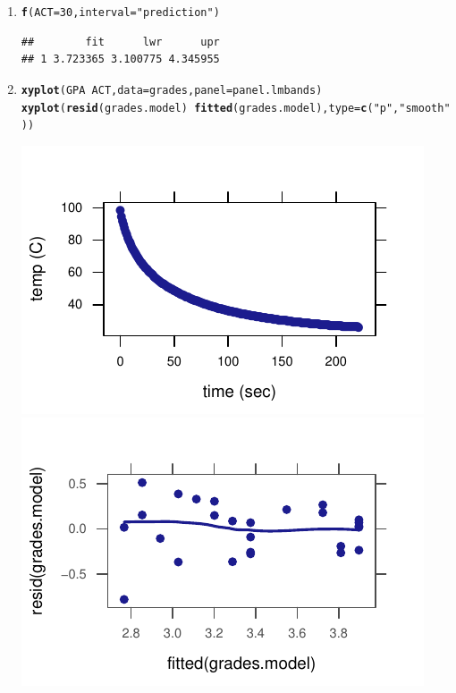 \documentclass[twoside]{book}\usepackage[]{graphicx}\usepackage[]{xcolor}
\makeatletter
\def\maxwidth{ %
  \ifdim\Gin@nat@width>\linewidth
    \linewidth
  \else
    \Gin@nat@width
  \fi
}
\newcommand{\hlnum}[1]{\textcolor[rgb]{0.686,0.059,0.569}{#1}}%
\newcommand{\hlstr}[1]{\textcolor[rgb]{0.192,0.494,0.8}{#1}}%
\newcommand{\hlopt}[1]{\textcolor[rgb]{0,0,0}{#1}}%
\newcommand{\hlstd}[1]{\textcolor[rgb]{0.345,0.345,0.345}{#1}}%
\newcommand{\hlkwc}[1]{\textcolor[rgb]{0.333,0.667,0.333}{#1}}%
\newcommand{\hlkwd}[1]{\textcolor[rgb]{0.737,0.353,0.396}{\textbf{#1}}}%
\newenvironment{kframe}{%
 \def\at@end@of@kframe{}%
 \ifinner\ifhmode%
  \def\at@end@of@kframe{\end{minipage}}%
  \begin{minipage}{\columnwidth}%
 \fi\fi%
 \def\FrameCommand##1{\hskip\@totalleftmargin \hskip-\fboxsep
 \colorbox{shadecolor}{##1}\hskip-\fboxsep
     \hskip-\linewidth \hskip-\@totalleftmargin \hskip\columnwidth}%
 \MakeFramed {\advance\hsize-\width
   \@totalleftmargin\z@ \linewidth\hsize
   \@setminipage}}%
 {\par\unskip\endMakeFramed%
 \at@end@of@kframe}
\newenvironment{knitrout}{}{} %
\makeatother
\begin{document}
\begin{solution}
\begin{enumerate}
		\item
\begin{knitrout}
\color{fgcolor}\begin{kframe}
\begin{alltt}
\hlkwd{f}\hlstd{(}\hlkwc{ACT} \hlstd{=} \hlnum{30}\hlstd{,} \hlkwc{interval} \hlstd{=} \hlstr{"prediction"}\hlstd{)}
\end{alltt}
\begin{verbatim}
##        fit      lwr      upr
## 1 3.723365 3.100775 4.345955
\end{verbatim}
\end{kframe}
\end{knitrout}
		\item
\begin{knitrout}
\color{fgcolor}\begin{kframe}
\begin{alltt}
\hlkwd{xyplot}\hlstd{(GPA} \hlopt{~} \hlstd{ACT,} \hlkwc{data} \hlstd{= grades,} \hlkwc{panel} \hlstd{= panel.lmbands)}
\hlkwd{xyplot}\hlstd{(}\hlkwd{resid}\hlstd{(grades.model)} \hlopt{~} \hlkwd{fitted}\hlstd{(grades.model),} \hlkwc{type} \hlstd{=} \hlkwd{c}\hlstd{(}\hlstr{"p"}\hlstd{,} \hlstr{"smooth"}\hlstd{))}
\end{alltt}
\end{kframe}

{\centering \includegraphics[width=\maxwidth]{figures/fig-unnamed-chunk-235-1} 
\includegraphics[width=\maxwidth]{figures/fig-unnamed-chunk-235-2} 

}
\end{knitrout}
\end{enumerate}
\end{solution}
\end{document}
